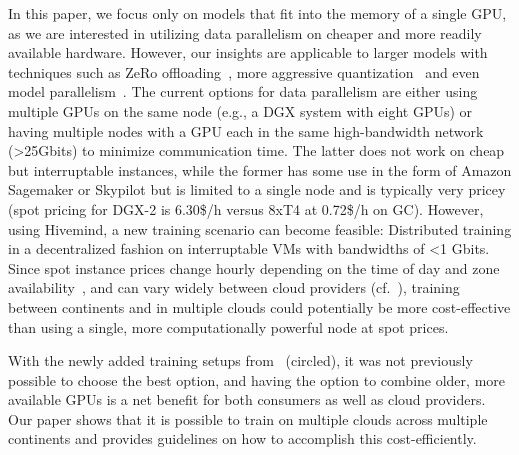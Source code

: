 In this paper, we focus only on models that fit into the memory of a single GPU, as we are interested in utilizing data parallelism on cheaper and more readily available hardware.
However, our insights are applicable to larger models with techniques such as ZeRo offloading~\cite{ren2021zerooffload}, more aggressive quantization~\cite{wortsman2023stable} and even model parallelism~\cite{ryabinin2023swarm}.
The current options for data parallelism are either using multiple GPUs on the same node (e.g., a DGX system with eight GPUs) or having multiple nodes with a GPU each in the same high-bandwidth network (>25Gbits) to minimize communication time.
The latter does not work on cheap but interruptable instances, while the former has some use in the form of Amazon Sagemaker or Skypilot but is limited to a single node and is typically very pricey (spot pricing for DGX-2 is 6.30\$/h versus 8xT4 at 0.72\$/h on GC).
However, using Hivemind, a new training scenario can become feasible: Distributed training in a decentralized fashion on interruptable VMs with bandwidths of <1 Gbits.
Since spot instance prices change hourly depending on the time of day and zone availability~\cite{lee2017deepspotcloud}, and can vary widely between cloud providers (cf.~), training between continents and in multiple clouds could potentially be more cost-effective than using a single, more computationally powerful node at spot prices.

With the newly added training setups from~ (circled), it was not previously possible to choose the best option, and having the option to combine older, more available GPUs is a net benefit for both consumers as well as cloud providers.
Our paper shows that it is possible to train on multiple clouds across multiple continents and provides guidelines on how to accomplish this cost-efficiently.